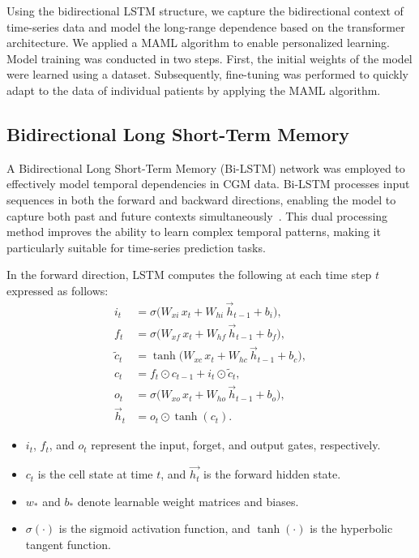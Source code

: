 Using the bidirectional LSTM structure, we capture the bidirectional context of time-series data and model the long-range dependence based on the transformer architecture. We applied a MAML algorithm to enable personalized learning. \mbox{}\protect\newline Model training was conducted in two steps. First, the initial weights of the model were learned using a dataset. Subsequently, fine-tuning was performed to quickly adapt to the data of individual patients by applying the MAML algorithm.

\subsection*{Bidirectional Long Short-Term Memory}
A Bidirectional Long Short-Term Memory (Bi-LSTM) network was employed to effectively model temporal dependencies in CGM data. Bi-LSTM processes input sequences in both the forward and backward directions, enabling the model to capture both past and future contexts simultaneously~\cite{2611532:32776386}. This dual processing method improves the ability to learn complex temporal patterns, making it particularly suitable for time-series prediction tasks.

In the forward direction, LSTM computes the following at each time step \( t \) expressed as follows:
\begin{equation}
\begin{aligned}
i_t &= \sigma \big(W_{xi}\, x_t + W_{hi}\, \overrightarrow{h}_{t-1} + b_i\big), \\
f_t &= \sigma \big(W_{xf}\, x_t + W_{hf}\, \overrightarrow{h}_{t-1} + b_f\big), \\
\tilde{c}_t &= \tanh\big(W_{xc}\, x_t + W_{hc}\, \overrightarrow{h}_{t-1} + b_c\big), \\
c_t &= f_t \odot c_{t-1} + i_t \odot \tilde{c}_t, \\
o_t &= \sigma \big(W_{xo}\, x_t + W_{ho}\, \overrightarrow{h}_{t-1} + b_o\big), \\
\overrightarrow{h}_t &= o_t \odot \tanh(c_t).
\end{aligned}
\label{dfg-b70a0c7f1921}
\end{equation}

\begin{itemize}
  \item \( i_t \), \( f_t \), and \( o_t \) represent the input, forget, and output gates, respectively.
  \item \( c_t \) is the cell state at time \( t \), and \( \overrightarrow{h_t} \) is the forward hidden state.
  \item \( w_\ast \) and \( b_\ast \) denote learnable weight matrices and biases.
  \item \( \sigma (\cdot) \) is the sigmoid activation function, and \( \tanh(\cdot) \) is the hyperbolic tangent function.
\end{itemize}


